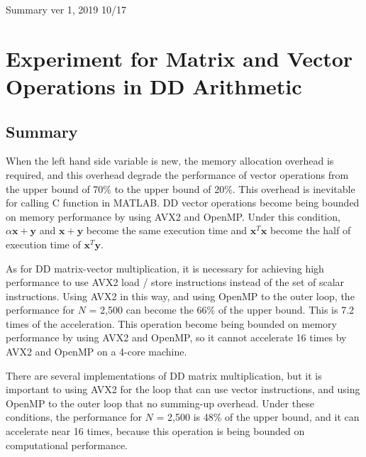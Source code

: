 \documentclass{IOS-Book-Article}
\begin{document}
\pagestyle{plain}
{\Large Summary ver 1, 2019 10/17}
\section{Experiment for Matrix and Vector Operations in DD Arithmetic}
\subsection{Summary}

When the left hand side variable is new, the memory allocation overhead is required, and this overhead degrade the performance of vector operations from the upper bound of 70\% to the upper bound of 20\%. 
This overhead is inevitable for calling C function in MATLAB.
DD vector operations become being bounded on memory performance by using AVX2 and OpenMP. Under this condition, $\alpha\bm{x}+\bm{y}$ and $\bm{x}+\bm{y}$ become the same execution time and $\bm{x}^T\bm{x}$ become the half of execution time of $\bm{x}^T\bm{y}$. 

As for DD matrix-vector multiplication, it is necessary for achieving high performance to use AVX2 load / store instructions instead of the set of scalar instructions. Using AVX2 in this way, and using OpenMP to the outer loop, the performance for $N$ = 2,500 can become the 66\% of the upper bound. This is 7.2 times of the acceleration. This operation become being bounded on memory performance by using AVX2 and OpenMP, so it cannot accelerate 16 times by AVX2 and OpenMP on a 4-core machine.

There are several implementations of DD matrix multiplication, but it is important to using AVX2 for the loop that can use vector instructions, and using OpenMP to the outer loop that no summing-up overhead. Under these conditions, the performance for $N$ = 2,500 is 48\% of the upper bound, and it can accelerate near 16 times, because this operation is being bounded on computational performance.
\end{document}
